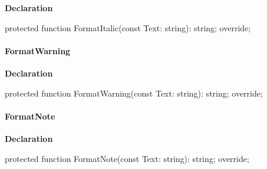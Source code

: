 \documentclass{report}
\newif\ifpdf
\begin{document}
\label{PasDoc_GenLatex.TTexDocGenerator-FormatItalic}
\begin{list}{}{
\setlength{\itemindent}{0cm}
\setlength{\listparindent}{0cm}
\setlength{\leftmargin}{\evensidemargin}
\addtolength{\leftmargin}{\tmplength}
\settowidth{\labelsep}{X}
\addtolength{\leftmargin}{\labelsep}
\setlength{\labelwidth}{\tmplength}
}
\item[\textbf{Declaration}\hfill]
\ifpdf
\begin{flushleft}
\fi
\begin{ttfamily}
protected function FormatItalic(const Text: string): string; override;\end{ttfamily}

\ifpdf
\end{flushleft}
\fi

\end{list}
\paragraph*{FormatWarning}\hspace*{\fill}

\label{PasDoc_GenLatex.TTexDocGenerator-FormatWarning}
\begin{list}{}{
\setlength{\itemindent}{0cm}
\setlength{\listparindent}{0cm}
\setlength{\leftmargin}{\evensidemargin}
\addtolength{\leftmargin}{\tmplength}
\settowidth{\labelsep}{X}
\addtolength{\leftmargin}{\labelsep}
\setlength{\labelwidth}{\tmplength}
}
\item[\textbf{Declaration}\hfill]
\ifpdf
\begin{flushleft}
\fi
\begin{ttfamily}
protected function FormatWarning(const Text: string): string; override;\end{ttfamily}

\ifpdf
\end{flushleft}
\fi

\end{list}
\paragraph*{FormatNote}\hspace*{\fill}

\label{PasDoc_GenLatex.TTexDocGenerator-FormatNote}
\begin{list}{}{
\setlength{\itemindent}{0cm}
\setlength{\listparindent}{0cm}
\setlength{\leftmargin}{\evensidemargin}
\addtolength{\leftmargin}{\tmplength}
\settowidth{\labelsep}{X}
\addtolength{\leftmargin}{\labelsep}
\setlength{\labelwidth}{\tmplength}
}
\item[\textbf{Declaration}\hfill]
\ifpdf
\begin{flushleft}
\fi
\begin{ttfamily}
protected function FormatNote(const Text: string): string; override;\end{ttfamily}

\ifpdf
\end{flushleft}
\fi

\end{list}
\end{document}
